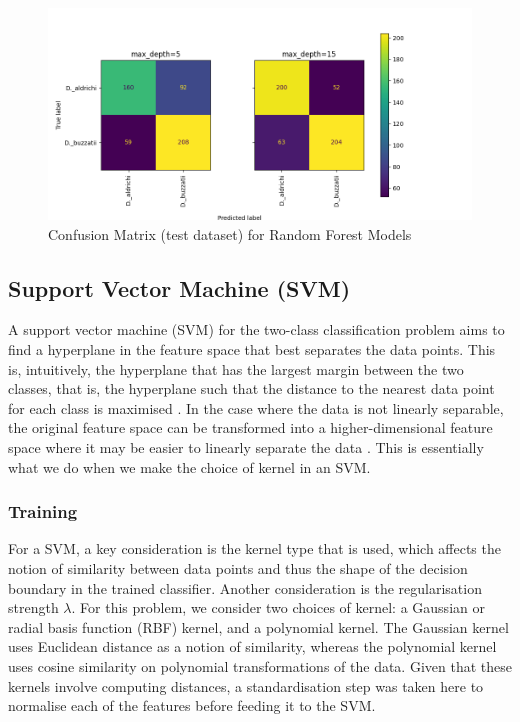 \begin{figure}[!ht]
\begin{center}
\includegraphics[width=\textwidth]{fig/cm_random_forest.png}
\end{center}
\caption{Confusion Matrix (test dataset) for Random Forest Models}
\label{randomforestcm}
\end{figure}

\subsection{Support Vector Machine (SVM)}

A support vector machine (SVM) for the two-class classification problem aims to find a hyperplane in the feature space that best separates the data points. This is, intuitively, the hyperplane that has the largest margin between the two classes, that is, the hyperplane such that the distance to the nearest data point for each class is maximised \parencite{smlbook}. In the case where the data is not linearly separable, the original feature space can be transformed into a higher-dimensional feature space where it may be easier to linearly separate the data \parencite{svmkernel}. This is essentially what we do when we make the choice of kernel in an SVM.

\subsubsection{Training}

For a SVM, a key consideration is the kernel type that is used, which affects the notion of similarity between data points and thus the shape of the decision boundary in the trained classifier. Another consideration is the regularisation strength $\lambda$. For this problem, we consider two choices of kernel: a Gaussian or radial basis function (RBF) kernel, and a polynomial kernel. The Gaussian kernel uses Euclidean distance as a notion of similarity, whereas the polynomial kernel uses cosine similarity on polynomial transformations of the data. Given that these kernels involve computing distances, a standardisation step was taken here to normalise each of the features before feeding it to the SVM.

